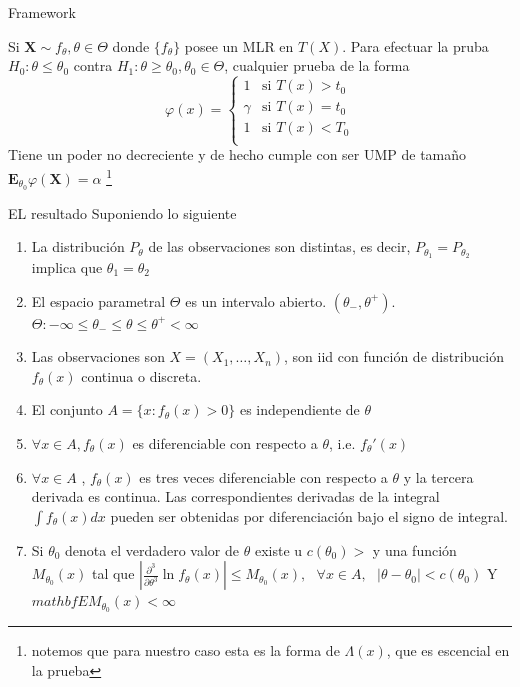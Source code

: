 \documentclass{beamer}
\begin{document}
\begin{frame}{Framework}
\begin{theorem}
Si $\mathbf{X} \sim f_\theta, \theta \in \Theta$ donde $\{f_\theta\}$ posee un MLR en $T(X)$. Para efectuar la pruba $H_0:\theta \leq \theta_0$ contra $H_1:\theta \geq \theta_0, \theta_0 \in \Theta$, cualquier prueba de la forma 
\begin{equation}
			\varphi(x)= \left\{ \begin{array}{lr}
							1 &	\textrm{si  } T(x) > t_0 \\
							\gamma  & \textrm{si  } T(x) = t_0 \\ 
							1 & \textrm{si  } T(x) < T_0 \\
							\end{array}
					\right.
\end{equation}
Tiene un poder no decreciente y de hecho cumple con ser UMP de tamaño $\mathbf{E}_{\theta_0}\varphi(\mathbf{X})=\alpha$ \footnote{notemos que para nuestro caso esta es la forma de $\Lambda(x)$, que es escencial en la prueba}
\end{theorem}
\end{frame}

\begin{frame}{EL resultado}
Suponiendo lo siguiente 
\begin{enumerate}
\item La distribución $P_\theta$ de las observaciones son distintas, es decir, $P_{\theta_1} = P_{\theta_2}$ implica que $\theta_1 =\theta_2$
\item  El espacio parametral $\Theta$ es un intervalo abierto. $(\theta_{-},\theta^{+})$. $\Theta: -\infty \leq  \theta _{-} \leq \theta \leq \theta^{+} < \infty $
\item Las observaciones son $X =(X_1,\dots, X_n)$, son iid con función de distribución $f_\theta(x)$ continua o discreta.
\item El conjunto $A = \{  x:f_\theta(x) >0 \}$ es independiente de $\theta$
\item $\forall x \in A, f_\theta(x)$ es diferenciable con respecto a $\theta$, i.e. $f_\theta'(x)$
\item  $\forall x \in A$ , $f_\theta(x)$ es tres veces diferenciable con respecto a $\theta$ y la tercera derivada es continua. Las correspondientes derivadas de la integral $\int f_\theta(x)dx$ pueden ser obtenidas por diferenciación bajo el signo de integral.
\item Si $\theta_0$ denota el verdadero valor de $\theta$ existe u $c(\theta_0)>$ y una función $M_{\theta_0}(x)$ tal que 
$\left|\frac{\partial^3}{\partial \theta^3} \ln f_\theta(x) \right| \leq M_{\theta_0}(x), \textrm{          } \forall x \in A, \textrm{     } |\theta-\theta_0| < c(\theta_0)$
Y $mathbf{E}M_{\theta_0}(x) < \infty$
\end{enumerate}
\end{frame}
\end{document}
